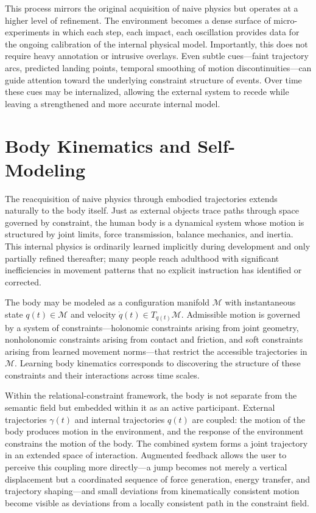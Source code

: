 \documentclass[12pt,a4paper,openany]{book}
\theoremstyle{plain}
\theoremstyle{definition}
\theoremstyle{remark}
\begin{document}
This process mirrors the original acquisition of naive physics but operates at a higher level of refinement. The environment becomes a dense surface of micro-experiments in which each step, each impact, each oscillation provides data for the ongoing calibration of the internal physical model. Importantly, this does not require heavy annotation or intrusive overlays. Even subtle cues---faint trajectory arcs, predicted landing points, temporal smoothing of motion discontinuities---can guide attention toward the underlying constraint structure of events. Over time these cues may be internalized, allowing the external system to recede while leaving a strengthened and more accurate internal model.

\section{Body Kinematics and Self-Modeling}

The reacquisition of naive physics through embodied trajectories extends naturally to the body itself. Just as external objects trace paths through space governed by constraint, the human body is a dynamical system whose motion is structured by joint limits, force transmission, balance mechanics, and inertia. This internal physics is ordinarily learned implicitly during development and only partially refined thereafter; many people reach adulthood with significant inefficiencies in movement patterns that no explicit instruction has identified or corrected.

The body may be modeled as a configuration manifold $\mathcal{M}$ with instantaneous state $q(t) \in \mathcal{M}$ and velocity $\dot{q}(t) \in T_{q(t)}\mathcal{M}$. Admissible motion is governed by a system of constraints---holonomic constraints arising from joint geometry, nonholonomic constraints arising from contact and friction, and soft constraints arising from learned movement norms---that restrict the accessible trajectories in $\mathcal{M}$. Learning body kinematics corresponds to discovering the structure of these constraints and their interactions across time scales.

Within the relational-constraint framework, the body is not separate from the semantic field but embedded within it as an active participant. External trajectories $\gamma(t)$ and internal trajectories $q(t)$ are coupled: the motion of the body produces motion in the environment, and the response of the environment constrains the motion of the body. The combined system forms a joint trajectory in an extended space of interaction. Augmented feedback allows the user to perceive this coupling more directly---a jump becomes not merely a vertical displacement but a coordinated sequence of force generation, energy transfer, and trajectory shaping---and small deviations from kinematically consistent motion become visible as deviations from a locally consistent path in the constraint field.
\end{document}
